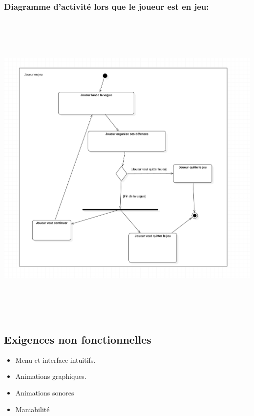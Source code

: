 \documentclass[10pt,a4paper]{article}
\begin{document}
\newpage
\subsubsection{Diagramme d'activité lors que le joueur est en jeu:}

\begin{center}
    \includegraphics[height=16cm,width=19cm]{joueur_en_jeu.png}
\end{center}

\newpage    
\subsection{Exigences non fonctionnelles}

\begin{itemize}
    \item Menu et interface intuitifs.
    \item Animations graphiques.
    \item Animations sonores
    \item Maniabilité
    
\end{itemize}
    
\end{document}
